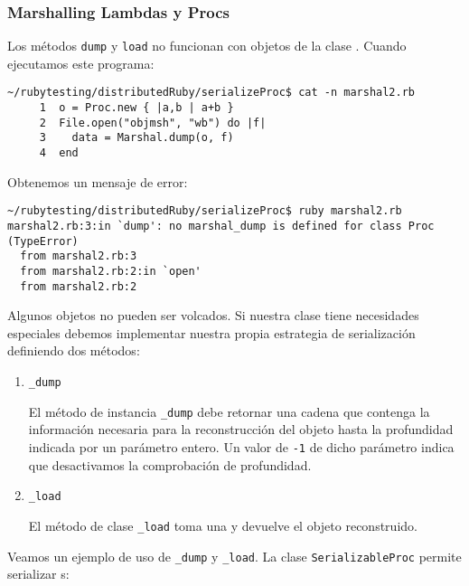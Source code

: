 \subsubsection{Marshalling Lambdas y Procs}
\label{susection:marshallinglambdas}
Los métodos \verb|dump| y \verb|load| no funcionan con objetos 
de la clase .
Cuando ejecutamos este programa:
\begin{verbatim}
~/rubytesting/distributedRuby/serializeProc$ cat -n marshal2.rb 
     1  o = Proc.new { |a,b | a+b }  
     2  File.open("objmsh", "wb") do |f|
     3    data = Marshal.dump(o, f) 
     4  end
\end{verbatim}
Obtenemos un mensaje de error:

\begin{verbatim}
~/rubytesting/distributedRuby/serializeProc$ ruby marshal2.rb 
marshal2.rb:3:in `dump': no marshal_dump is defined for class Proc (TypeError)
  from marshal2.rb:3
  from marshal2.rb:2:in `open'
  from marshal2.rb:2
\end{verbatim}

Algunos objetos no pueden ser volcados. Si nuestra clase tiene necesidades especiales
debemos implementar nuestra propia estrategia de serialización definiendo dos métodos:
\begin{enumerate}
\item \verb|_dump|

El método de instancia \verb|_dump| debe retornar una cadena 
que contenga la información necesaria para la reconstrucción del objeto hasta 
la profundidad indicada por un parámetro entero.
Un valor de \verb|-1| de dicho parámetro indica que desactivamos la comprobación de profundidad.

\item \verb|_load|

El método de clase \verb|_load| toma una  y devuelve el objeto reconstruido.
\end{enumerate}

Veamos un ejemplo de uso de \verb|_dump| y \verb|_load|.
La clase \verb|SerializableProc| 
permite serializar s:

